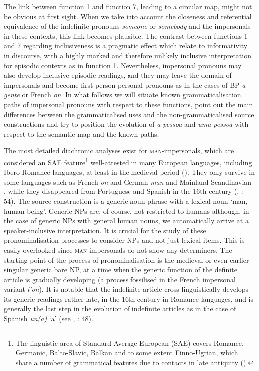 \documentclass[output=paper]{langscibook}
\begin{document}
{The link between function 1 and function 7, leading to a circular map, might not be obvious at first sight. When we take into account the closeness and referential equivalence of the indefinite pronouns} {\textit{someone}} {or} {\textit{somebody}} {and the impersonals in these contexts, this link becomes plausible. The contrast between functions 1 and 7 regarding inclusiveness is a pragmatic effect which  \citet[154]{GastvanderAuwera2013} relate to informativity in discourse, with a highly marked and therefore unlikely inclusive interpretation for episodic contexts as in function 1. Nevertheless, impersonal pronouns may also develop inclusive episodic readings, and they may leave the domain of impersonals and become first person personal pronouns as in the cases of BP} {\textit{a gente}} {\citep{Lopes2004} or French} {\textit{on}}{. In what follows we will situate known grammaticalisation paths of impersonal pronouns with respect to these functions, point out the main differences between the grammaticalised uses and the non-grammaticalised source constructions and try to position the evolution of} {\textit{a pessoa} }{and} {\textit{uma pessoa}} {with respect to the semantic map and the known paths.}



{The most detailed diachronic analyses exist for} {\textsc{man}}{{}-impersonals, which are considered an SAE feature}\footnote{The linguistic area of Standard Average European (SAE) covers Romance, Germanic, Balto-Slavic, Balkan and to some extent Finno-Ugrian, which share a number of grammatical features due to contacts in late antiquity (\citealt{Haspelmath2001}).} {well{}-attested in many European languages, including Ibero-Romance languages, at least in the medieval period (\citealt{GiacaloneRamatSansò2007}). They only survive in some languages such as French} {\textit{on}} {and German} {\textit{man}} {and Mainland Scandinavian \citep{Egerland2003}, while they disappeared from Portuguese and Spanish in the 16th century (\citealt{CompanyPozas2009}, \citealt{Lopes2003}: 54). The source construction is a generic noun phrase with a lexical noun ‘man, human being’. Generic NPs are, of course, not restricted to humans although, in the case of generic NPs with general human nouns, we automatically arrive at a speaker-inclusive interpretation. It is crucial for the study of these pronominalisation processes to consider NPs and not just lexical items. This is easily overlooked since} {\textsc{man}}{{}-impersonals do not show any determiners. The starting point of the process of pronominalisation is the medieval or even earlier singular generic bare NP, at a time when the generic function of the definite article is gradually developing (a process fossilised in the French impersonal variant} \textit{l’on}). It is notable that the indefinite article cross-linguistically develops its generic readings rather late, in the 16th century in Romance languages, and is generally the last step in the evolution of indefinite articles as in the case of Spanish {\textit{un(a)}} {‘a’ (see \citealt{Givón1978,Givón1981}, \citealt{Elvira1994}: 48).}
\end{document}
